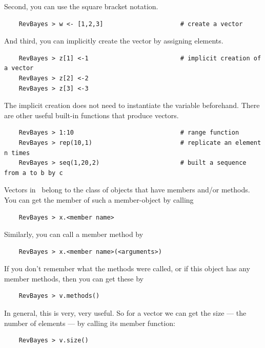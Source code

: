 Second, you can use the square bracket notation.
{\tt \begin{snugshade*}
\begin{lstlisting}    
    RevBayes > w <- [1,2,3]                     # create a vector
\end{lstlisting}
\end{snugshade*}}
And third, you can implicitly create the vector by assigning elements.
{\tt \begin{snugshade*}
\begin{lstlisting}    
    RevBayes > z[1] <-1                         # implicit creation of a vector
    RevBayes > z[2] <-2                   
    RevBayes > z[3] <-3                  
\end{lstlisting}
\end{snugshade*}} 
The implicit creation does not need to instantiate the variable beforehand.
There are other useful built-in functions that produce vectors.
{\tt \begin{snugshade*}
\begin{lstlisting}    
    RevBayes > 1:10                             # range function
    RevBayes > rep(10,1)                        # replicate an element n times
    RevBayes > seq(1,20,2)                      # built a sequence from a to b by c
\end{lstlisting}
\end{snugshade*}} 

Vectors in \Rev~belong to the class of objects that have members and/or methods.
You can get the member of such a member-object by calling
{\tt \begin{snugshade*}
\begin{lstlisting}    
    RevBayes > x.<member name>
\end{lstlisting}
\end{snugshade*}} 
Similarly, you can call a member method by
{\tt \begin{snugshade*}
\begin{lstlisting}    
    RevBayes > x.<member name>(<arguments>)                 
\end{lstlisting}
\end{snugshade*}} 
If you don't remember what the methods were called, or if this object has any member methods, then you can get these by
{\tt \begin{snugshade*}
\begin{lstlisting}    
    RevBayes > v.methods()                 
\end{lstlisting}
\end{snugshade*}} 
In general, this is very, very useful.
So for a vector we can get the size --- the number of elements --- by calling its member function:
{\tt \begin{snugshade*}
\begin{lstlisting}    
    RevBayes > v.size()                 
\end{lstlisting}
\end{snugshade*}} 


